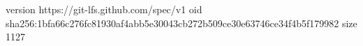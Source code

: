 version https://git-lfs.github.com/spec/v1
oid sha256:1bfa66c276fc81930af4abb5e30043cb272b509ce30e63746ce34f4b5f179982
size 1127
